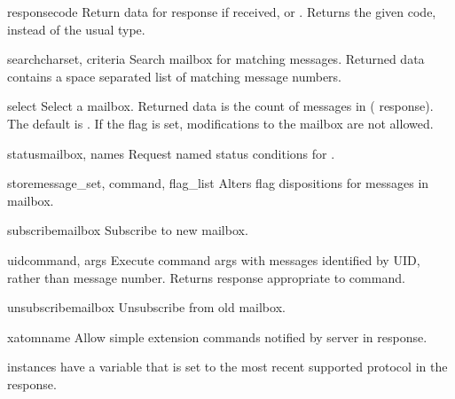 \begin{methoddesc}{response}{code}
  Return data for response  if received, or
  . Returns the given code, instead of the usual type.
\end{methoddesc}

\begin{methoddesc}{search}{charset, criteria}
  Search mailbox for matching messages. Returned data contains a space
  separated list of matching message numbers.
\end{methoddesc}

\begin{methoddesc}{select}{}
  Select a mailbox. Returned data is the count of messages in
   ( response).  The default 
  is .  If the  flag is set, modifications
  to the mailbox are not allowed.
\end{methoddesc}

\begin{methoddesc}{status}{mailbox, names}
  Request named status conditions for . 
\end{methoddesc}

\begin{methoddesc}{store}{message_set, command, flag_list}
  Alters flag dispositions for messages in mailbox.
\end{methoddesc}

\begin{methoddesc}{subscribe}{mailbox}
  Subscribe to new mailbox.
\end{methoddesc}

\begin{methoddesc}{uid}{command, args}
  Execute command args with messages identified by UID, rather than
  message number. Returns response appropriate to command.
\end{methoddesc}

\begin{methoddesc}{unsubscribe}{mailbox}
  Unsubscribe from old mailbox.
\end{methoddesc}

\begin{methoddesc}{xatom}{name}
  Allow simple extension commands notified by server in
   response.
\end{methoddesc}


 instances have a variable  that
is set to the most recent supported protocol in the 
response.

